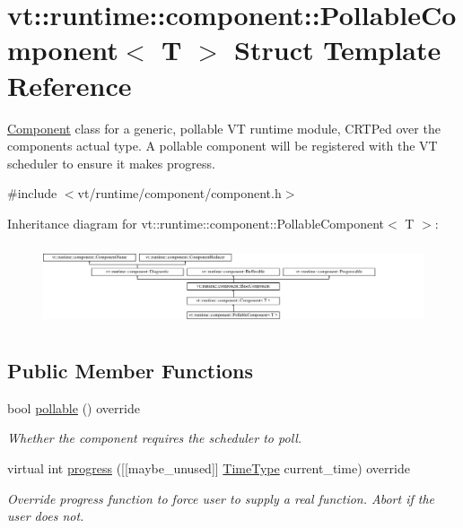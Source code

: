 \hypertarget{structvt_1_1runtime_1_1component_1_1_pollable_component}{}\section{vt\+:\+:runtime\+:\+:component\+:\+:Pollable\+Component$<$ T $>$ Struct Template Reference}
\label{structvt_1_1runtime_1_1component_1_1_pollable_component}


{\ttfamily \hyperlink{structvt_1_1runtime_1_1component_1_1_component}{Component}} class for a generic, pollable VT runtime module, C\+R\+TP\textquotesingle{}ed over the component\textquotesingle{}s actual type. A pollable component will be registered with the VT scheduler to ensure it makes progress.  




{\ttfamily \#include $<$vt/runtime/component/component.\+h$>$}

Inheritance diagram for vt\+:\+:runtime\+:\+:component\+:\+:Pollable\+Component$<$ T $>$\+:\begin{figure}[H]
\begin{center}
\leavevmode
\includegraphics[height=2.422145cm]{structvt_1_1runtime_1_1component_1_1_pollable_component}
\end{center}
\end{figure}
\subsection*{Public Member Functions}
\begin{DoxyCompactItemize}
\item 
bool \hyperlink{structvt_1_1runtime_1_1component_1_1_pollable_component_a8ad6cfbc184ed9862cae5304605fe025}{pollable} () override
\begin{DoxyCompactList}\small\item\em Whether the component requires the scheduler to poll. \end{DoxyCompactList}\item 
virtual int \hyperlink{structvt_1_1runtime_1_1component_1_1_pollable_component_a69282f6c04cf56740dc6372abcf0f820}{progress} (\mbox{[}\mbox{[}maybe\+\_\+unused\mbox{]}\mbox{]} \hyperlink{namespacevt_a2b9f28078dc309ad0706b69ded743e69}{Time\+Type} current\+\_\+time) override
\begin{DoxyCompactList}\small\item\em Override progress function to force user to supply a real function. Abort if the user does not. \end{DoxyCompactList}\end{DoxyCompactItemize}
